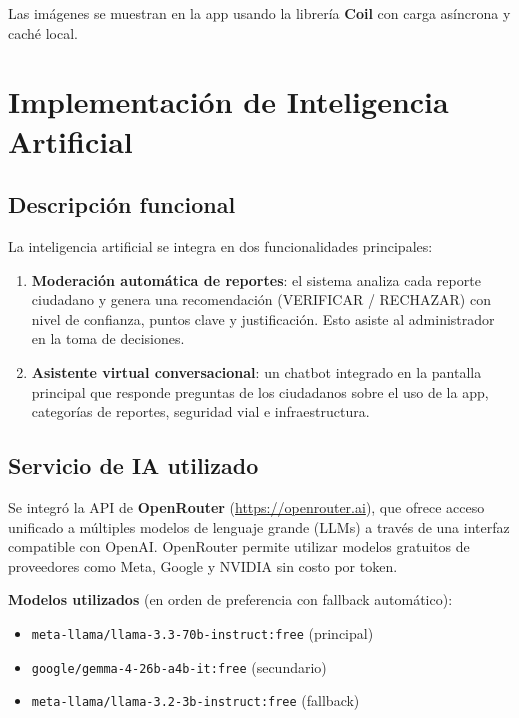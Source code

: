 \documentclass[12pt,a4paper]{article}
\begin{document}
Las imágenes se muestran en la app usando la librería \textbf{Coil} con carga asíncrona y caché local.

\section{Implementación de Inteligencia Artificial}

\subsection{Descripción funcional}

La inteligencia artificial se integra en dos funcionalidades principales:

\begin{enumerate}[leftmargin=1.5em]
    \item \textbf{Moderación automática de reportes}: el sistema analiza cada reporte ciudadano y genera una recomendación (VERIFICAR / RECHAZAR) con nivel de confianza, puntos clave y justificación. Esto asiste al administrador en la toma de decisiones.
    \item \textbf{Asistente virtual conversacional}: un chatbot integrado en la pantalla principal que responde preguntas de los ciudadanos sobre el uso de la app, categorías de reportes, seguridad vial e infraestructura.
\end{enumerate}

\subsection{Servicio de IA utilizado}

Se integró la API de \textbf{OpenRouter} (\url{https://openrouter.ai}), que ofrece acceso unificado a múltiples modelos de lenguaje grande (LLMs) a través de una interfaz compatible con OpenAI. OpenRouter permite utilizar modelos gratuitos de proveedores como Meta, Google y NVIDIA sin costo por token.

\textbf{Modelos utilizados} (en orden de preferencia con fallback automático):
\begin{itemize}[leftmargin=1.5em]
    \item \texttt{meta-llama/llama-3.3-70b-instruct:free} (principal)
    \item \texttt{google/gemma-4-26b-a4b-it:free} (secundario)
    \item \texttt{meta-llama/llama-3.2-3b-instruct:free} (fallback)
\end{itemize}
\end{document}

